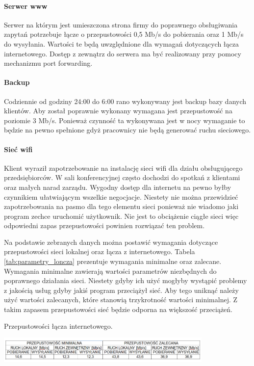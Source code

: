 \documentclass{report}
\begin{document}
\paragraph{Serwer www}Serwer na którym jest umieszczona strona firmy do poprawnego obsługiwania zapytań potrzebuje łącze o przepustowości 0,5 Mb/s do pobierania oraz
1 Mb/s do wysyłania.  Wartości te będą uwzględnione dla wymagań dotyczących łącza internetowego. Dostęp z zewnątrz do serwera ma być realizowany przy pomocy mechanizmu port forwarding.

\paragraph{Backup}Codziennie od godziny 24:00 do 6:00 rano wykonywany jest backup bazy danych klientów. Aby został poprawnie wykonany wymagana jest przepustowość 
na poziomie 3 Mb/s. Ponieważ czynność ta wykonywana jest w nocy wymaganie to będzie na pewno spełnione gdyż pracownicy nie będą generować ruchu
sieciowego.

\paragraph{Sieć wifi}Klient wyraził zapotrzebowanie na instalację sieci wifi dla działu obsługującego przedsiębiorców. W sali konferencyjnej często dochodzi  
do spotkań z klientami oraz małych narad zarządu. Wygodny dostęp dla internetu na pewno byłby czynnikiem ułatwiającym wszelkie negocjacje.
Niestety nie można przewidzieć zapotrzebowania na pasmo dla tego elementu sieci ponieważ nie wiadomo jaki program zechce uruchomić użytkownik.
Nie jest to obciążenie ciągłe sieci więc odpowiedni zapas przepustowości powinien rozwiązać ten problem.

Na podstawie zebranych danych można postawić wymagania dotyczące przepustowości sieci lokalnej oraz łącza z internetowego. Tabela \ref{tab:parametry_loncza}
prezentuje wymagania minimalne oraz zalecane. Wymagania minimalne zawierają wartości parametrów niezbędnych do poprawnego działania sieci. 
Niestety gdyby ich użyć mogłyby wystąpić problemy z jakością usług gdyby jakiś program przeciążył sieć. Aby tego uniknąć należy użyć wartości
zalecanych, które stanowią trzykrotność wartości minimalnej. Z takim zapasem przepustowości sieć będzie odporna na większość przeciążeń.


\begin{table}[H]
\caption{Przepustowości łącza internetowego. }
\label{tab:parametry_loncza}
 \centering
      \includegraphics[width=0.8\textwidth]{./obrazki/ruch_tabele/loncze.png}
\end{table}
\end{document}

